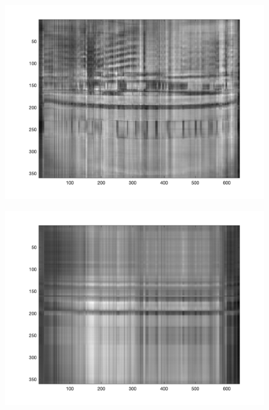 \documentclass{article}
\begin{document}
\begin{figure}[H]
    \hfill
    \begin{minipage}{0.18\textwidth}
        \includegraphics[width=\linewidth]{pictures/compression2.png}
        \label{fig:image31}
    \end{minipage}
    \hfill
    \begin{minipage}{0.18\textwidth}
        \includegraphics[width=\linewidth]{pictures/compression4.png}
        \label{fig:image41}
    \end{minipage}
    \hfill
    \begin{minipage}{0.18\textwidth}

\end{minipage}
\end{figure}
\end{document}
